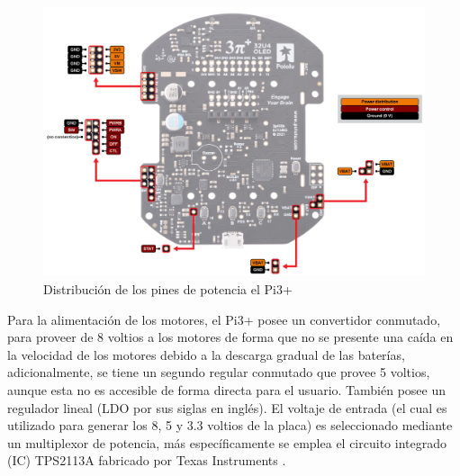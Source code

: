  \begin{figure}[H]
    \centering
    \includegraphics[scale=.2]{imagenes/PololuPower.jpg}
    \caption{Distribución de los pines de potencia el Pi3+ \cite{noauthor_pololu_nodate}}
    \label{fig:power}
 \end{figure}

 Para la alimentación de los motores, el Pi3+ posee un convertidor conmutado, para proveer de 8 voltios a los motores
 de forma que no se presente una caída en la velocidad de los motores debido a la descarga gradual de las baterías,
 adicionalmente, se tiene un segundo regular conmutado que provee 5 voltios, aunque esta no es accesible de forma directa
 para el usuario. También posee un regulador lineal (LDO por sus siglas en inglés). El voltaje de entrada (el cual es 
 utilizado para generar los 8, 5 y 3.3 voltios de la placa) es seleccionado mediante un multiplexor de potencia, más 
 específicamente se emplea el circuito integrado (IC) TPS2113A fabricado por Texas Instruments \cite{noauthor_pololu_nodate}.

 










